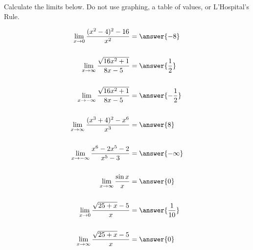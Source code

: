 \documentclass{ximera}
\author{Nela Lakos \and Kyle Parsons}
\begin{document}
\begin{exercise}

Calculate the limits below.  Do not use graphing, a table of values, or L'Hospital's Rule.

\begin{align*}
\lim_{x\to0}\frac{(x^2-4)^2 - 16}{x^2} &= \answer{-8}\\ \\
\lim_{x\to\infty}\frac{\sqrt{16x^2+1}}{8x-5} &= \answer{\frac{1}{2}}\\ \\
\lim_{x\to-\infty}\frac{\sqrt{16x^2+1}}{8x-5} &= \answer{-\frac{1}{2}}\\ \\
\lim_{x\to\infty}\frac{(x^3+4)^2 - x^6}{x^3} &= \answer{8}\\ \\
\lim_{x\to-\infty}\frac{x^6-2x^5-2}{x^5-3} &= \answer{-\infty}\\ \\
\lim_{x\to\infty}\frac{\sin x}{x} &= \answer{0}\\ \\
\lim_{x\to0}\frac{\sqrt{25+x}-5}{x} &= \answer{\frac{1}{10}}\\ \\
\lim_{x\to\infty}\frac{\sqrt{25+x}-5}{x} &= \answer{0}
\end{align*}

\end{exercise}
\end{document}
